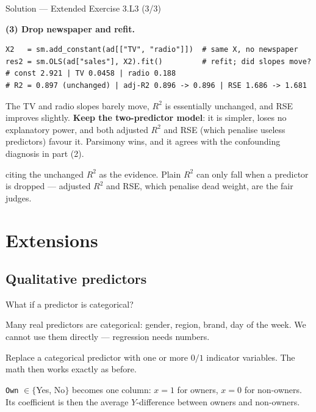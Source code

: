 \documentclass[aspectratio=169,11pt]{beamer}
\begin{document}
\begin{frame}[fragile]{Solution --- Extended Exercise 3.L3 (3/3)}
  \begin{solutionbox}
    \textbf{(3) Drop newspaper and refit.}
\begin{lstlisting}
X2   = sm.add_constant(ad[["TV", "radio"]])  # same X, no newspaper
res2 = sm.OLS(ad["sales"], X2).fit()         # refit; did slopes move?
# const 2.921 | TV 0.0458 | radio 0.188
# R2 = 0.897 (unchanged) | adj-R2 0.896 -> 0.896 | RSE 1.686 -> 1.681
\end{lstlisting}
    The TV and radio slopes barely move, $R^2$ is essentially unchanged,
    and RSE improves slightly. \textbf{Keep the two-predictor model}: it
    is simpler, loses no explanatory power, and both adjusted $R^2$ and
    RSE (which penalise useless predictors) favour it. Parsimony wins,
    and it agrees with the confounding diagnosis in part (2).
  \end{solutionbox}
  \begin{mistake}
    citing the unchanged $R^2$ as the evidence.
    Plain $R^2$ can only fall when a predictor is dropped --- adjusted
    $R^2$ and RSE, which penalise dead weight, are the fair judges.
  \end{mistake}
\end{frame}

\section{Extensions}
\subsection{Qualitative predictors}

\begin{frame}{What if a predictor is categorical?}
  \par
  Many real predictors are categorical: gender, region, brand, day of
  the week. We cannot use them directly --- regression needs numbers.
  \begin{takeaway}
    Replace a categorical predictor with one or more $0/1$ indicator
    variables. The math then works exactly as before.
  \end{takeaway}
  \begin{numexample}
    \texttt{Own} $\in\{$Yes, No$\}$ becomes one column: $x=1$ for owners,
    $x=0$ for non-owners. Its coefficient is then the average
    $Y$-difference between owners and non-owners.
  \end{numexample}
\end{frame}
\end{document}
